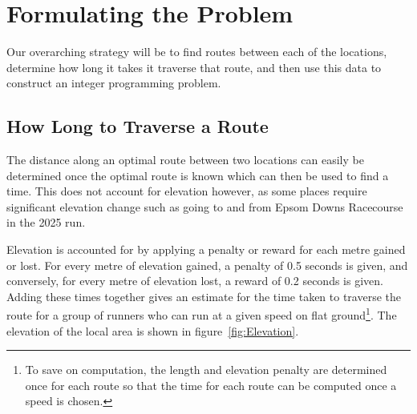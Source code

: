 \section{Formulating the Problem}
\label{sec:FormulatingTheProblem}

Our overarching strategy will be to find routes between each of the locations, determine how long it takes it traverse that route, and then use this data to construct an integer programming problem.

\subsection{How Long to Traverse a Route}
\label{sec:HowLongToTraverseARoute}

The distance along an optimal route between two locations can easily be determined once the optimal route is known which can then be used to find a time. This does not account for elevation however, as some places require significant elevation change such as going to and from Epsom Downs Racecourse in the 2025 run.

Elevation is accounted for by applying a penalty or reward for each metre gained or lost. For every metre of elevation gained, a penalty of 0.5 seconds is given, and conversely, for every metre of elevation lost, a reward of 0.2 seconds is given. Adding these times together gives an estimate for the time taken to traverse the route for a group of runners who can run at a given speed on flat ground\footnote{To save on computation, the length and elevation penalty are determined once for each route so that the time for each route can be computed once a speed is chosen.}. The elevation of the local area is shown in figure~\ref{fig:Elevation}.


\vfill

